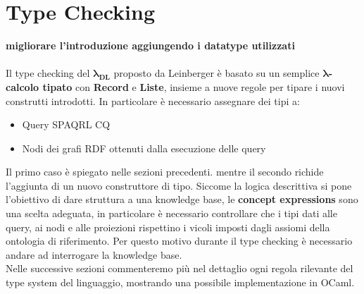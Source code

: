     \section{Type Checking}
        \textbf{migliorare l'introduzione aggiungendo i datatype utilizzati}
        \\\\
        Il type checking del $\boldsymbol{\lambda_{DL}}$ proposto da Leinberger è basato su un semplice $\boldsymbol{\lambda}$\textbf{-calcolo tipato} con \textbf{Record} e \textbf{Liste}, insieme a nuove regole per tipare i nuovi construtti introdotti.
        In particolare è necessario assegnare dei tipi a:
        \begin{itemize}
            \item Query SPAQRL CQ
            \item Nodi dei grafi RDF ottenuti dalla esecuzione delle query 
        \end{itemize}
        Il primo caso è spiegato nelle sezioni precedenti. mentre il secondo richide l'aggiunta di un nuovo construttore di tipo. Siccome la logica descrittiva si pone
        l'obiettivo di dare struttura a una knowledge base, le \textbf{concept expressions} sono una scelta adeguata, in particolare è necessario controllare che i tipi dati alle query, ai nodi e alle proiezioni rispettino i vicoli imposti dagli assiomi 
        della ontologia di riferimento. Per questo motivo durante il type checking è necessario andare ad interrogare la knowledge base.
        \\Nelle successive sezioni commenteremo più nel dettaglio ogni regola rilevante del type system del linguaggio, mostrando una possibile implementazione in OCaml.

